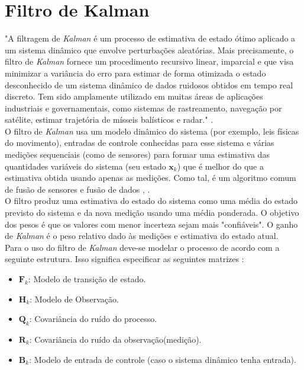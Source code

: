 \section{Filtro de Kalman}

"A filtragem de \emph{Kalman} é um processo de estimativa de estado ótimo aplicado a um sistema dinâmico que envolve perturbações aleatórias. Mais precisamente, o filtro de \emph{Kalman} fornece um  procedimento recursivo linear, imparcial e que visa minimizar a variância do erro para estimar de forma otimizada o estado desconhecido de um sistema dinâmico de dados ruidosos obtidos em tempo real discreto. Tem sido amplamente utilizado em muitas áreas de aplicações industriais e governamentais, como sistemas de rastreamento, navegação por satélite, estimar trajetória de mísseis balísticos e radar." \cite{kalman:book}.\\

O filtro de \emph{Kalman} usa um modelo dinâmico do sistema (por exemplo, leis físicas do movimento), entradas de controle conhecidas para esse sistema e várias medições sequenciais (como de sensores) para formar uma estimativa das quantidades variáveis do sistema (seu estado $\textbf{x}_k$) que é melhor do que a estimativa obtida usando apenas as medições. Como tal, é um algoritmo comum de fusão de sensores e fusão de dados \cite{kalman:wiki}, \cite{Kalman:ofid}.\\

O filtro produz uma estimativa do estado do sistema como uma média do estado previsto do sistema e da nova medição usando uma média ponderada. O objetivo dos pesos é que os valores com menor incerteza sejam mais "confiáveis". O ganho de \emph{Kalman} é o peso relativo dado às medições e estimativa do estado atual.\\

Para o uso do filtro de \emph{Kalman} deve-se modelar o processo de acordo com a seguinte estrutura. Isso significa especificar as seguintes matrizes \cite{kalman:book}:

\begin{itemize}
    \item $\textbf{F}_k$: Modelo de transição de estado.
    \item $\textbf{H}_k$: Modelo de Observação.
    \item $\textbf{Q}_k$: Covariância do ruído do processo.
    \item $\textbf{R}_k$: Covariância do ruído da observação(medição).
    \item $\textbf{B}_k$: Modelo de entrada de controle (caso o sistema dinâmico tenha entrada). 
\end{itemize}


